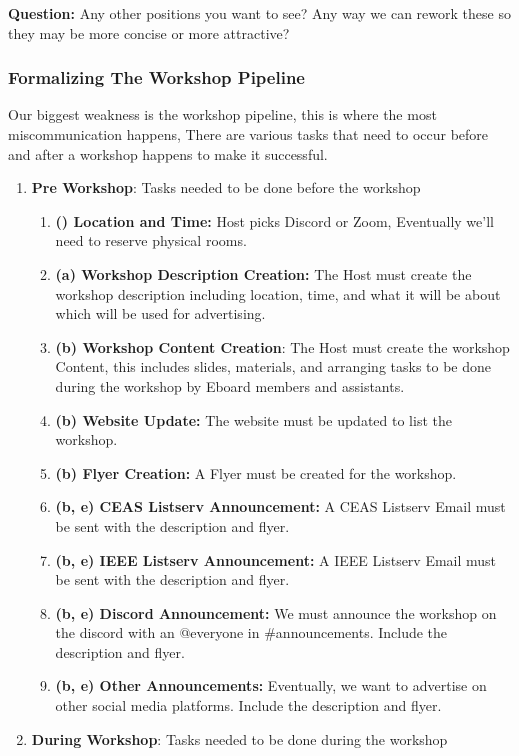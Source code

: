 \documentclass{article}
\begin{document}
\noindent
\textbf{Question:} Any other positions you want to see? Any way we can rework these so they may be more concise or more attractive? 

\subsubsection{Formalizing The Workshop Pipeline}
Our biggest weakness is the workshop pipeline, this is where the most miscommunication happens, There are various tasks that need to occur before and after a workshop happens to make it successful.

\begin{enumerate}
    \item \textbf{Pre Workshop}: Tasks needed to be done before the workshop
    \begin{enumerate}
        \item \textbf{() Location and Time:} Host picks Discord or Zoom, Eventually we'll need to reserve physical rooms.
        \item \textbf{(a) Workshop Description Creation:} The Host must create the workshop description including location, time, and what it will be about which will be used for advertising.
        \item \textbf{(b) Workshop Content Creation}: The Host must create the workshop Content, this includes slides, materials, and arranging tasks to be done during the workshop by Eboard members and assistants. 
        \item \textbf{(b) Website Update:} The website must be updated to list the workshop.
        \item \textbf{(b) Flyer Creation:} A Flyer must be created for the workshop.
        \item \textbf{(b, e) CEAS Listserv Announcement:} A CEAS Listserv Email must be sent with the description and flyer. 
        \item \textbf{(b, e) IEEE Listserv Announcement:} A IEEE Listserv Email must be sent with the description and flyer. 
        \item \textbf{(b, e) Discord Announcement:} We must announce the workshop on the discord with an @everyone in \#announcements. Include the description and flyer.  
        \item \textbf{(b, e) Other Announcements:} Eventually, we want to advertise on other social media platforms. Include the description and flyer.
    \end{enumerate}
    \item \textbf{During Workshop}: Tasks needed to be done during the workshop

\end{enumerate}
\end{document}
